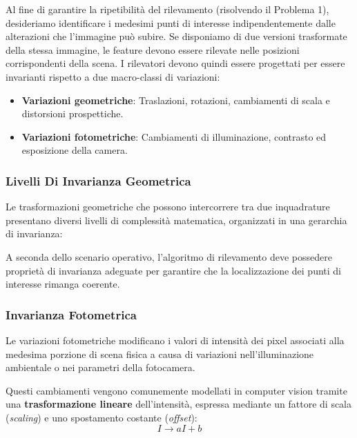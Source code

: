 ﻿\documentclass[11pt, a4paper]{article}
\begin{document}
Al fine di garantire la ripetibilità del rilevamento (risolvendo il Problema 1), desideriamo identificare i medesimi punti di interesse indipendentemente dalle alterazioni che l'immagine può subire. Se disponiamo di due versioni trasformate della stessa immagine, le feature devono essere rilevate nelle posizioni corrispondenti della scena. I rilevatori devono quindi essere progettati per essere invarianti rispetto a due macro-classi di variazioni:

\begin{itemize}
    \item \textbf{Variazioni geometriche}: Traslazioni, rotazioni, cambiamenti di scala e distorsioni prospettiche.
    \item \textbf{Variazioni fotometriche}: Cambiamenti di illuminazione, contrasto ed esposizione della camera.
\end{itemize}

\subsubsection{Livelli Di Invarianza Geometrica}
Le trasformazioni geometriche che possono intercorrere tra due inquadrature presentano diversi livelli di complessità matematica, organizzati in una gerarchia di invarianza:


A seconda dello scenario operativo, l'algoritmo di rilevamento deve possedere proprietà di invarianza adeguate per garantire che la localizzazione dei punti di interesse rimanga coerente.

\subsubsection{Invarianza Fotometrica}
Le variazioni fotometriche modificano i valori di intensità dei pixel associati alla medesima porzione di scena fisica a causa di variazioni nell'illuminazione ambientale o nei parametri della fotocamera.


Questi cambiamenti vengono comunemente modellati in computer vision tramite una \textbf{trasformazione lineare} dell'intensità, espressa mediante un fattore di scala (\emph{scaling}) e uno spostamento costante (\emph{offset}):
\[ I \to aI + b \]
\end{document}
